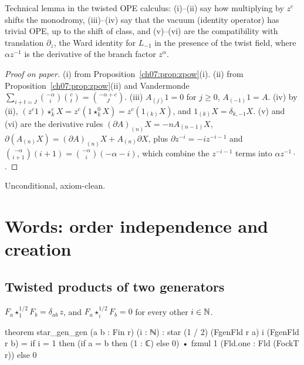 \begin{physics}
Technical lemma in the twisted OPE calculus: (i)--(ii) say how multiplying by $z^c$ shifts the monodromy, (iii)--(iv) say that the vacuum (identity operator) has trivial OPE, up to the shift of class, and (v)--(vi) are the compatibility with translation $\partial_z$, the Ward identity for $L_{-1}$ in the presence of the twist field, where $\alpha z^{-1}$ is the derivative of the branch factor $z^\alpha$.
\end{physics}

\begin{proof}[Proof on paper]
(i) from Proposition~\ref{ch07:prop:zpow}(i). (ii) from Proposition~\ref{ch07:prop:zpow}(ii) and
Vandermonde $\sum_{i+t=J}\binom{-\alpha}i\binom ct = \binom{-\alpha+c}{J}$. (iii) $A_{(j)}1 = 0$
for $j\ge0$, $A_{(-1)}1 = A$. (iv) by (ii), $(z^c1)\star^c_kX = z^c(1\star^0_kX) =
z^c(1_{(k)}X)$, and $1_{(k)}X = \delta_{k,-1}X$. (v) and (vi) are the derivative rules
$(\partial A)_{(n)}X = -nA_{(n-1)}X$, $\partial(A_{(n)}X) = (\partial A)_{(n)}X+A_{(n)}\partial
X$, plus $\partial z^{-i} = -iz^{-i-1}$ and $\binom{-\alpha}{i+1}(i+1) =
\binom{-\alpha}i(-\alpha-i)$, which combine the $z^{-i-1}$ terms into $\alpha z^{-1}\cdot$.
\end{proof}

\begin{status}
Unconditional, axiom-clean.
\end{status}

\section{Words: order independence and creation}\label{ch07:sec:words}

\subsection{Twisted products of two generators}

\begin{proposition}\label{ch07:prop:stargengen}
$F_a\star^{1/2}_1F_b = \delta_{ab}\,z$, and $F_a\star^{1/2}_iF_b = 0$ for every other $i\in{\mathbb{N}}$.
\end{proposition}

\begin{leancode}
theorem star_gen_gen (a b : Fin r) (i : ℕ) :
    star (1 / 2) (FgenFld r a) i (FgenFld r b)
      = if i = 1 then (if a = b then (1 : ℂ) else 0) • fzmul 1 (Fld.one : Fld (FockT r))
        else 0
\end{leancode}

